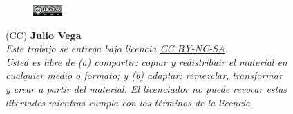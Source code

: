 
\vspace{5cm}

\begin{flushright}

\begin{figure}
\includegraphics[width=0.10\textwidth,right]{figs/by-nc-sa.png}
\end{figure}

\vspace{0.2cm}

{\tiny 
(CC) \textbf{Julio Vega}\\ %
\vspace{0.5cm}
\emph{
Este trabajo se entrega bajo licencia \href{https://creativecommons.org/licenses/by-nc-sa/3.0/es/}{CC BY-NC-SA}. \\
Usted es libre de \textit{(a) compartir}: copiar y redistribuir el material en \\
cualquier medio o formato; y \textit{(b) adaptar}: remezclar, transformar \\
y crear a partir del material. El licenciador no puede revocar estas \\
libertades mientras cumpla con los términos de la licencia. \\}
}

\end{flushright}

